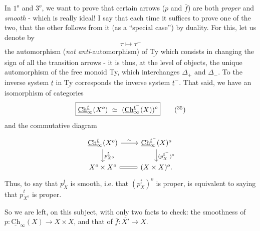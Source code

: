 \documentclass[11pt]{article}
\newcommand{\printedpage}[1]{\marginpar{\footnotesize p.~#1}}
\newcommand{\msp}[1]{\marginpar{\footnotesize [#1]}}
\newcommand{\Ch}{\underline{\mathrm{Ch}}}
\newcommand{\Ty}{\underline{\mathrm{Ty}}}
\begin{document}
\printedpage{89}

\msp{page 143}
In $1^o$ and $3^o$, we want to prove that certain arrows ($p$ and $\bar{f}$) are both \textit{proper} and \textit{smooth} - which is really ideal! I say that each time it suffices to prove one of the two, that the other follows from it (as a ``special case'') by duality. For this, let us denote by
\[
\tau \longmapsto \tau^{-}
\]
the automorphism (\textit{not anti}-automorphism) of $\Ty$ which consists in changing the sign of all the transition arrows - it is thus, at the level of objects, the unique automorphism of the free monoid Ty, which interchanges $\Delta_+$ and $\Delta_-$. To the inverse system $\underline{t}$ in $\Ty$ corresponds the inverse system $\underline{t}^-$. That said, we have an isomorphism of categories
\[
\boxed{\Ch^{\underline{t}}_{\infty}(X^o) \ \simeq\ (\Ch^{\underline{t}^-}_{\infty}(X))^o} \tag*{$(^{35})$} %
\]
and the commutative diagram
\[
\begin{tikzcd}
\Ch^{\underline{t}}_{\infty}(X^o) \arrow[r, "\sim"] \arrow[d, "p^{\underline{t}}_{X^o}"] & \Ch^{\underline{t}^-}_{\infty}(X)^o \arrow[d, "(p^{\underline{t}^-}_{X})^o"] \\
X^o \times X^o \arrow[r, equal] & (X \times X)^o.
\end{tikzcd}
\]
Thus, to say that $p^{\underline{t}}_{X}$ is smooth, i.e. that $(p^{\underline{t}}_{X})^o$ is proper, is equivalent to saying that $p^{\underline{t}}_{X^o}$ is proper.

\msp{page 144}
So we are left, on this subject, with only two facts to check: the smoothness of $p : \Ch_{\infty}(X) \longrightarrow X \times X$, and that of $\bar{f} : \overline{X'} \longrightarrow X$.
\end{document}
